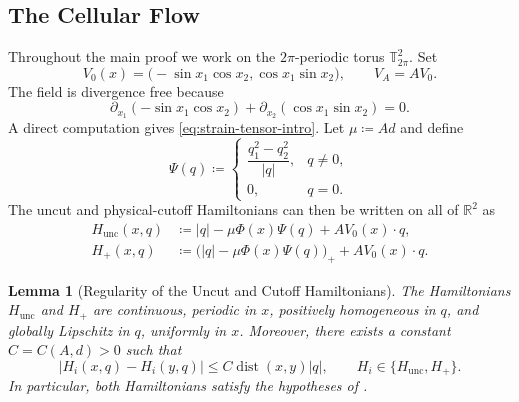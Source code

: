 \documentclass[11pt,reqno,noamsfonts]{amsart}
\newtheorem{lemma}[theorem]{Lemma}
\theoremstyle{definition}
\theoremstyle{remark}
\newcommand{\T}{\mathbb T}
\newcommand{\dist}{\operatorname{dist}}
\newcommand{\Hunc}{H_{\mathrm{unc}}}
\newcommand{\Hcut}{H_{+}}
\begin{document}
\subsection{The Cellular Flow}
Throughout the main proof we work on the $2\pi$-periodic torus $\T^2_{2\pi}$.  Set
\begin{equation}\label{eq:V0}
  V_0(x)=\bigl(-\sin x_1\cos x_2, \cos x_1\sin x_2\bigr),
  \qquad
  V_A=A V_0.
\end{equation}
The field is divergence free because
\[
  \partial_{x_1}(-\sin x_1\cos x_2)
  +\partial_{x_2}(\cos x_1\sin x_2)=0.
\]
A direct computation gives \eqref{eq:strain-tensor-intro}.
Let $\mu\coloneqq Ad$ and define
\[
  \Psi(q)
  \coloneqq 
  \begin{cases}
  \dfrac{q_1^2-q_2^2}{|q|},&q\ne0,\\[0.8em]
  0,&q=0.
  \end{cases}
\]
The uncut and physical-cutoff Hamiltonians can then be written on all of
$\mathbb R^2$ as
\begin{align}
  \Hunc(x,q)
  &\coloneqq |q|-\mu\Phi(x)\Psi(q)+A V_0(x)\cdot q,
  \label{eq:Hunc}\\
  \Hcut(x,q)
  &\coloneqq \bigl(|q|-\mu\Phi(x)\Psi(q)\bigr)_+
     +A V_0(x)\cdot q.\nonumber
\end{align}

\begin{lemma}[Regularity of the Uncut and Cutoff Hamiltonians]
\label{lem:unc-cut-regularity}
The Hamiltonians $\Hunc$ and $\Hcut$ are continuous, periodic in $x$,
positively homogeneous in $q$, and globally Lipschitz in $q$, uniformly
in $x$. Moreover, there exists a constant $C=C(A,d)>0$ such that
\[
  |H_i(x,q)-H_i(y,q)|
  \le C \dist(x,y)|q|,
  \qquad
  H_i\in\{\Hunc,\Hcut\}.
\]
In particular, both Hamiltonians satisfy the hypotheses of
.
\end{lemma}
\end{document}
